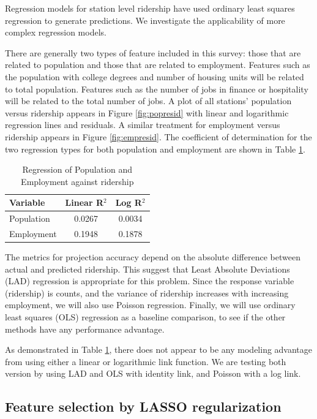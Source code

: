 \documentclass[11pt]{article}
\begin{document}
Regression models for station level ridership have used ordinary least squares regression \cite{Kuby2004, Taylor2008, Currie2011, Durning2015, Gutierrez2011} to generate predictions. We investigate the applicability of more complex regression models.


There are generally two types of feature included in this survey: those that are related to population and those that are related to employment. Features such as the population with college degrees and number of housing units will be related to total population. Features such as the number of jobs in finance or hospitality will be related to the total number of jobs. A plot of all stations' population versus ridership appears in Figure \ref{fig:popresid} with linear and logarithmic regression lines and residuals. A similar treatment for employment versus ridership appears in Figure \ref{fig:empresid}. The coefficient of determination for the two regression types for both population and employment are shown in Table \ref{tab:regr2}.

\begin{table}
\centering
\begin{tabular}{lcc}
\toprule Variable&Linear R$^2$&Log R$^2$ \\ 
\midrule Population&0.0267&0.0034 \\
Employment&0.1948&0.1878 \\
\bottomrule
\end{tabular}
\caption{Regression of Population and Employment against ridership}\label{tab:regr2}
\end{table}

The metrics for projection accuracy depend on the absolute difference between actual and predicted ridership. This suggest that Least Absolute Deviations (LAD) regression is appropriate for this problem. Since the response variable (ridership) is counts, and the variance of ridership increases with increasing employment, we will also use Poisson regression. Finally, we will use ordinary least squares (OLS) regression as a baseline comparison, to see if the other methods have any performance advantage.

As demonstrated in Table \ref{tab:regr2}, there does not appear to be any modeling advantage from using either a linear or logarithmic link function. We are testing both version by using LAD and OLS with identity link, and Poisson with a log link.

\subsection{Feature selection by LASSO regularization}
\end{document}
